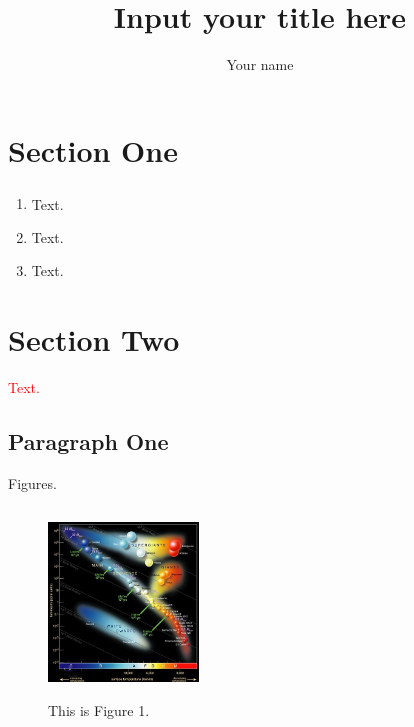 \documentclass[11pt, a4paper]{article}
\title{{\Huge Input your title here}}
\author{Your name}
\numberwithin{equation}{section} %
\newcommand{\tcr}{\textcolor{blue}}
\newcommand{\upcite}[1]{\textsuperscript{\textsuperscript{\tcr{\cite{#1}}}}}
\begin{document}
\maketitle

\tableofcontents %
\newpage



\section{Section One}

	\begin{enumerate}
	\item Text\upcite{ref1}.

	\item Text\cite{ref1,ref2}.

	\item Text.
	\end{enumerate}

\section{Section Two}

	\textcolor{red}{Text.}

	\subsection{Paragraph One}

		Figures.

		\begin{figure}[h]
			\centering
			\includegraphics[width=4cm,height=5cm]{2-1.png}
			\caption{This is Figure 1.}
		\end{figure}
\end{document}

